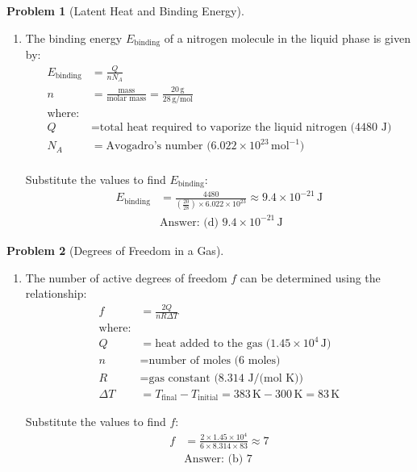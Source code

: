 \documentclass[12pt]{article}
\theoremstyle{definition} %
\newtheorem{problem}{Problem}
\theoremstyle{plain} %
\begin{document}
\begin{problem}[Latent Heat and Binding Energy]
    \noindent
    \begin{enumerate}
        \item 
        The binding energy \( E_{\text{binding}} \) of a nitrogen molecule in the liquid phase is given by:
        \begin{align*}
        E_{\text{binding}} &= \frac{Q}{n N_A} \\
        n &= \frac{\text{mass}}{\text{molar mass}} = \frac{20 \, \text{g}}{28 \, \text{g/mol}} \\
        \text{where:} \\
        Q &= \text{total heat required to vaporize the liquid nitrogen (4480 J)} \\
        N_A &= \text{Avogadro's number (} 6.022 \times 10^{23} \, \text{mol}^{-1} \text{)} \\
        \end{align*}

        Substitute the values to find \( E_{\text{binding}} \):
        \begin{align*}
        E_{\text{binding}} &= \frac{4480}{\left( \frac{20}{28} \right) \times 6.022 \times 10^{23}} \approx 9.4 \times 10^{-21} \, \text{J} \\
        &\text{Answer: (d) } 9.4 \times 10^{-21} \, \text{J}
        \end{align*}
    \end{enumerate}
\end{problem}
\begin{problem}[Degrees of Freedom in a Gas]
    \noindent
    \begin{enumerate}
        \item 
        The number of active degrees of freedom \( f \) can be determined using the relationship:
        \begin{align*}
        f &= \frac{2Q}{n R \Delta T} \\
        \text{where:} \\
        Q &= \text{heat added to the gas (} 1.45 \times 10^4 \, \text{J)} \\
        n &= \text{number of moles (6 moles)} \\
        R &= \text{gas constant (8.314 J/(mol K))} \\
        \Delta T &= T_{\text{final}} - T_{\text{initial}} = 383 \, \text{K} - 300 \, \text{K} = 83 \, \text{K}
        \end{align*}

        Substitute the values to find \( f \):
        \begin{align*}
        f &= \frac{2 \times 1.45 \times 10^4}{6 \times 8.314 \times 83} \approx 7 \\
        &\text{Answer: (b) } 7
        \end{align*}
    \end{enumerate}
\end{problem}
\end{document}
